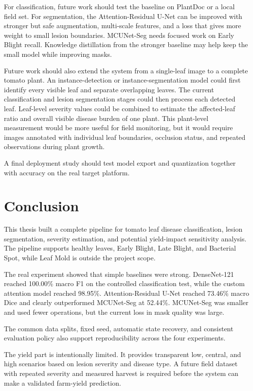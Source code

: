 \documentclass[12pt,a4paper]{article}
\begin{document}
For classification, future work should test the baseline on PlantDoc or a local field set.
For segmentation, the Attention-Residual U-Net can be improved with stronger but safe
augmentation, multi-scale features, and a loss that gives more weight to small lesion
boundaries. MCUNet-Seg needs focused work on Early Blight recall. Knowledge distillation
from the stronger baseline may help keep the small model while improving masks.

Future work should also extend the system from a single-leaf image to a complete tomato
plant. An instance-detection or instance-segmentation model could first identify every
visible leaf and separate overlapping leaves. The current classification and lesion
segmentation stages could then process each detected leaf. Leaf-level severity values could
be combined to estimate the affected-leaf ratio and overall visible disease burden of one
plant. This plant-level measurement would be more useful for field monitoring, but it would
require images annotated with individual leaf boundaries, occlusion status, and repeated
observations during plant growth.

A final deployment study should test model export and quantization together with
accuracy on the real target platform.

\section{Conclusion}
This thesis built a complete pipeline for tomato leaf disease classification, lesion
segmentation, severity estimation, and potential yield-impact sensitivity analysis. The
pipeline supports healthy leaves, Early Blight, Late Blight, and Bacterial Spot, while Leaf
Mold is outside the project scope.

The real experiment showed that simple baselines were strong. DenseNet-121 reached
100.00\% macro F1 on the controlled classification test, while the custom attention model
reached 98.95\%. Attention-Residual U-Net reached 73.46\% macro Dice and clearly
outperformed MCUNet-Seg at 52.44\%. MCUNet-Seg was smaller and used fewer operations,
but the current loss in mask quality was large.

The common data splits, fixed seed, automatic state recovery, and consistent evaluation
policy also support reproducibility across the four experiments.

The yield part is intentionally limited. It provides transparent low, central, and high
scenarios based on lesion severity and disease type. A future field dataset with repeated
severity and measured harvest is required before the system can make a validated farm-yield
prediction.

\clearpage
{}


\end{document}
